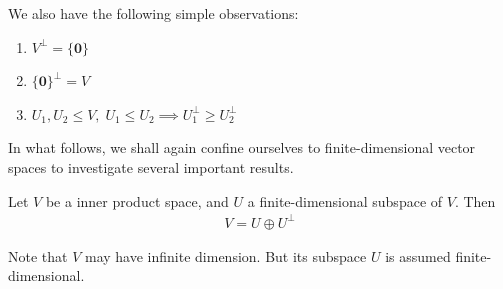 \documentclass[thmcnt=section, color=blue, 12pt]{my-elegantbook}
\begin{document}
We also have the following simple observations:
\begin{enumerate}
	\item $V^\perp = \{\mathbf{0}\}$
	\item $\{\mathbf{0}\}^\perp = V$
	\item $U_1, U_2 \leq V, \; U_1 \leq U_2 \implies U_1^\perp \geq U_2^\perp$
\end{enumerate}

In what follows, we shall again confine ourselves
to finite-dimensional vector spaces to investigate
several important results.

\begin{theorem} \label{thm:12}
	Let $V$ be a inner product space,
	and $U$ a finite-dimensional subspace of $V$.
	Then 
	\begin{align*}
		V = U \oplus U^\perp
	\end{align*}
\end{theorem}

\begin{note}
	Note that $V$ may have infinite dimension.
	But its subspace $U$ is assumed finite-dimensional.
\end{note}
\end{document}
